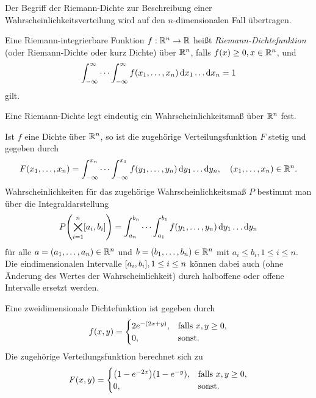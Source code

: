 \documentclass{lecture}
\begin{document}
    Der Begriff der Riemann-Dichte zur Beschreibung einer Wahrscheinlichkeitsverteilung wird auf den \(n\)-dimensionalen Fall übertragen.

    \begin{definition}
        Eine Riemann-integrierbare Funktion \(f: \R^n \to \R\) heißt \emph{Riemann-Dichtefunktion} (oder Riemann-Dichte oder kurz Dichte) über \(\R^n\), falls \(f\parentheses*{x} \ge 0, x \in \R^n\), und
        \[
            \int_{-\infty}^\infty \cdots \int_{-\infty}^\infty f\parentheses*{x_1, \ldots, x_n}\d x_1 \ldots \d x_n = 1
        \]
        gilt.
    \end{definition}

    Eine Riemann-Dichte legt eindeutig ein Wahrscheinlichkeitsmaß über \(\R^n\) fest.

    \begin{remark}
        Ist \(f\) eine Dichte über \(\R^n\), so ist die zugehörige Verteilungsfunktion \(F\) stetig und gegeben durch
        \[
            F\parentheses*{x_1, \ldots, x_n} = \int_{-\infty}^{x_n} \cdots \int_{-\infty}^{x_1}f\parentheses*{y_1, \ldots, y_n}\d y_1 \ldots \d y_n, \quad \parentheses*{x_1, \ldots, x_n} \in \R^n.
        \]
        Wahrscheinlichkeiten für das zugehörige Wahrscheinlichkeitsmaß \(P\) bestimmt man über die Integraldarstellung
        \[
            P\parentheses*{\bigtimes_{i = 1}^n \brackets*{a_i, b_i}} = \int_{a_n}^{b_n} \cdots \int_{a_1}^{b_1}f\parentheses*{y_1, \ldots, y_n}\d y_1 \ldots \d y_n
        \]
        für alle \(a = \parentheses*{a_1, \ldots, a_n} \in \R^n\) und \(b = \parentheses*{b_1, \ldots, b_n} \in \R^n\) mit \(a_i \le b_i, 1 \le i \le n\).
        Die eindimensionalen Intervalle \(\brackets*{a_i, b_i}, 1 \le i \le n\) können dabei auch (ohne Änderung des Wertes der Wahrscheinlichkeit) durch halboffene oder offene Intervalle ersetzt werden.
    \end{remark}

    \begin{example}
        Eine zweidimensionale Dichtefunktion ist gegeben durch
        \[
            f\parentheses*{x, y} = \begin{cases}
                2e^{-\parentheses*{2x + y}}, & \text{falls }x, y \ge 0,\\
                0, & \text{sonst}.
            \end{cases}
        \]
        Die zugehörige Verteilungsfunktion berechnet sich zu
        \[
            F\parentheses*{x, y} = \begin{cases}
                \parentheses*{1 - e^{-2x}}\parentheses*{1 - e^{-y}}, & \text{falls }x, y \ge 0,\\
                0, & \text{sonst}.
            \end{cases}
        \]
    \end{example}
\end{document}
